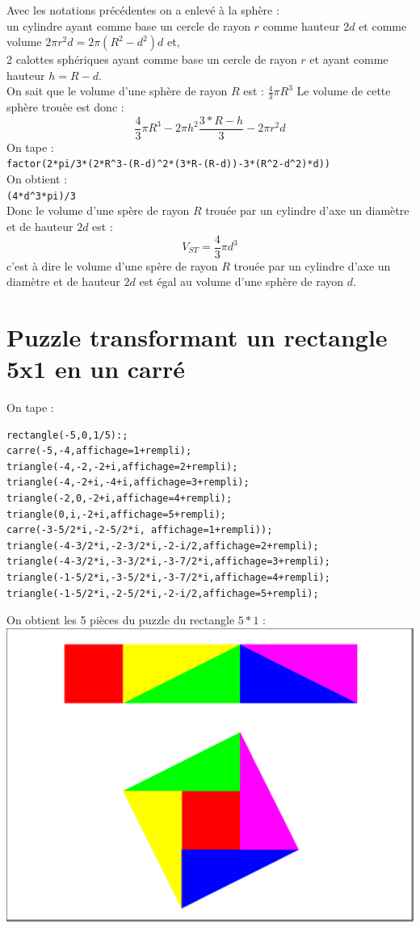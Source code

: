 \documentclass[a4paper,11pt]{book}
\begin{document}
Avec les notations pr\'ec\'edentes on a enlev\'e \`a la sph\`ere :\\
un cylindre ayant comme base un cercle de rayon $r$  comme hauteur $2d$ et 
comme volume $2\pi r^2d=2\pi (R^2-d^2)d$ et,\\
 2 calottes sph\'eriques ayant comme base 
un cercle de rayon $r$ et ayant comme hauteur $h=R-d$.\\
On sait que le volume d'une sph\`ere de rayon $R$ est : $\frac{4}{3}\pi R^3$
Le volume de cette sph\`ere trou\`ee est donc :\\
$$\frac{4}{3}\pi R^3-2\pi h^2\frac{3*R-h}{3}-2\pi r^2d$$
On tape :\\
{\tt factor(2*pi/3*(2*R\verb|^|3-(R-d)\verb|^|2*(3*R-(R-d))-3*(R\verb|^|2-d\verb|^|2)*d))}\\
On obtient :\\
{\tt (4*d\verb|^|3*pi)/3}\\
Donc le volume d'une sp\`ere de rayon $R$ trou\'ee par un cylindre d'axe un 
diam\`etre et de hauteur $2d$ est :
$$V_{ST}=\frac{4}{3}\pi d^3$$
c'est \`a dire le volume d'une sp\`ere de rayon $R$ trou\'ee par un cylindre d'axe un 
diam\`etre et de hauteur $2d$ est \'egal au volume d'une sph\`ere de rayon $d$.
\section{Puzzle transformant un rectangle 5x1 en un carr\'e}
On tape :
\begin{verbatim}
rectangle(-5,0,1/5):;
carre(-5,-4,affichage=1+rempli);
triangle(-4,-2,-2+i,affichage=2+rempli);
triangle(-4,-2+i,-4+i,affichage=3+rempli);
triangle(-2,0,-2+i,affichage=4+rempli);
triangle(0,i,-2+i,affichage=5+rempli);
carre(-3-5/2*i,-2-5/2*i, affichage=1+rempli));
triangle(-4-3/2*i,-2-3/2*i,-2-i/2,affichage=2+rempli);
triangle(-4-3/2*i,-3-3/2*i,-3-7/2*i,affichage=3+rempli);
triangle(-1-5/2*i,-3-5/2*i,-3-7/2*i,affichage=4+rempli);
triangle(-1-5/2*i,-2-5/2*i,-2-i/2,affichage=5+rempli);
\end{verbatim}
On obtient les 5 pi\`eces du puzzle du rectangle $5*1$ :\\
\includegraphics[width=\textwidth]{carresqrt5}
\end{document}
